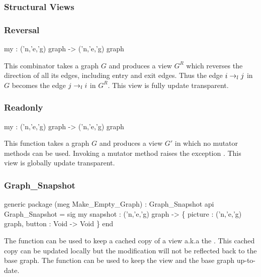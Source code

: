 \subsubsection{Structural Views}\label{sec:structural-views}

\subsubsection{Reversal}
\begin{SML}
   my  : ('n,'e,'g) graph -> ('n,'e,'g) graph
\end{SML}
   This combinator takes a graph $G$ and produces a view $G^R$
which reverses the direction
of all its edges, including entry and exit edges.  Thus 
the edge $i \rightarrow_{l} j$ in $G$ becomes the edge
$j \rightarrow_{l} i$ in $G^R$.  This view is fully update transparent.

\subsubsection{Readonly}
\begin{SML}
   my  : ('n,'e,'g) graph -> ('n,'e,'g) graph
\end{SML} 
  This function takes a graph $G$ and produces a view $G'$
in which no mutator methods can be used.  Invoking a mutator
method raises the exception .
This view is globally update transparent.

\subsubsection{Graph_Snapshot}
\begin{SML}
   generic package (meg Make_Empty_Graph) : Graph_Snapshot 
   api Graph_Snapshot = sig
      my snapshot : ('n,'e,'g) graph -> 
        \{ picture : ('n,'e,'g) graph, button : Void -> Void \}
   end
\end{SML}

The function  can be used to keep a cached copy
of a view a.k.a the .    This cached copy
can be updated locally but the modification will not be reflected back
to the base graph.  The function  can be used to
keep the view and the base graph up-to-date.

